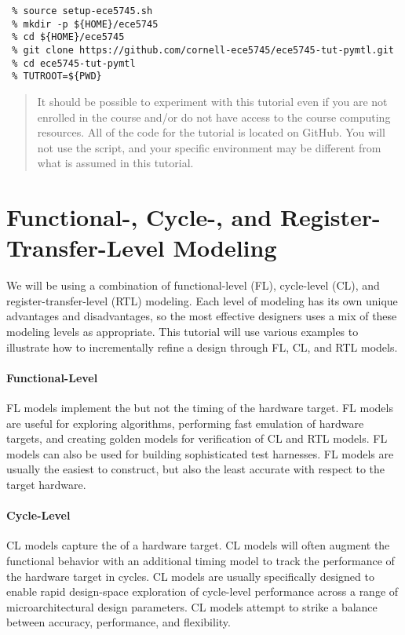 \documentclass{cbxdoc}
\begin{document}
\begin{verbatim}
 % source setup-ece5745.sh
 % mkdir -p ${HOME}/ece5745
 % cd ${HOME}/ece5745
 % git clone https://github.com/cornell-ece5745/ece5745-tut-pymtl.git
 % cd ece5745-tut-pymtl
 % TUTROOT=${PWD}
\end{verbatim}

\begin{quote}
   It should be possible to experiment with this tutorial even
  if you are not enrolled in the course and/or do not have access to the
  course computing resources. All of the code for the tutorial is located
  on GitHub. You will not use the  script, and your
  specific environment may be different from what is assumed in this
  tutorial.
\end{quote}


\section{Functional-, Cycle-, and Register-Transfer-Level Modeling}
\label{sec-modeling}

We will be using a combination of functional-level (FL), cycle-level
(CL), and register-transfer-level (RTL) modeling. Each level of modeling
has its own unique advantages and disadvantages, so the most effective
designers uses a mix of these modeling levels as appropriate. This
tutorial will use various examples to illustrate how to incrementally
refine a design through FL, CL, and RTL models.

\paragraph{Functional-Level}
FL models implement the  but not the timing of the
hardware target. FL models are useful for exploring algorithms,
performing fast emulation of hardware targets, and creating golden models
for verification of CL and RTL models. FL models can also be used for
building sophisticated test harnesses. FL models are usually the easiest
to construct, but also the least accurate with respect to the target
hardware.

\paragraph{Cycle-Level}
CL models capture the  of a hardware
target. CL models will often augment the functional behavior with an
additional timing model to track the performance of the hardware target
in cycles. CL models are usually specifically designed to enable rapid
design-space exploration of cycle-level performance across a range of
microarchitectural design parameters. CL models attempt to strike a
balance between accuracy, performance, and flexibility.
\end{document}
